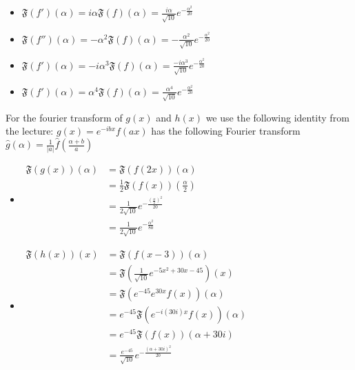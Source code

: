 \documentclass[11pt]{article}
\begin{document}
\begin{solution}
\begin{itemize}
\item $\mathfrak{F}\left(f' \right)(\alpha) = i \alpha \mathfrak{F}(f)(\alpha) = \frac{i \alpha}{\sqrt{10}} e^{-\frac{\alpha^2}{20}}$
\item $\mathfrak{F}\left(f'' \right)(\alpha) = -\alpha^2 \mathfrak{F}(f)(\alpha) = -\frac{ \alpha^2}{\sqrt{10}} e^{-\frac{\alpha^2}{20}}$
\item $\mathfrak{F}\left(f' \right)(\alpha) = -i \alpha^3 \mathfrak{F}(f)(\alpha) = \frac{-i \alpha^3}{\sqrt{10}} e^{-\frac{\alpha^2}{20}}$
\item $\mathfrak{F}\left(f' \right)(\alpha) = \alpha^4 \mathfrak{F}(f)(\alpha) = \frac{ \alpha^4}{\sqrt{10}} e^{-\frac{\alpha^2}{20}}$
\end{itemize}
For the fourier transform of $g(x)$ and $h(x)$ we use the following identity from the lecture: $g(x)=e^{-i b x} f(a x)$ has the following Fourier transform 
$\hat{g}(\alpha)=\frac{1}{|a|} \hat{f}\left(\frac{\alpha+b}{a}\right)$
\begin{itemize}
\item $\begin{aligned} \mathfrak{F}(g(x))(\alpha) & =\mathfrak{F}(f(2 x))(\alpha) \\ & =\frac{1}{2} \mathfrak{F}(f(x))\left(\frac{\alpha}{2}\right) \\ & =\frac{1}{2 \sqrt{10}} e^{-\frac{\left(\frac{\alpha}{2}\right)^2}{20}} \\ & =\frac{1}{2 \sqrt{10}} e^{-\frac{\alpha^2}{80}}\end{aligned}$
\item $\begin{aligned} \mathfrak{F}(h(x))(x) & =\mathfrak{F}(f(x-3))(\alpha) \\ & =\mathfrak{F}\left(\frac{1}{\sqrt{10}} e^{-5 x^2+30 x-45}\right)(x) \\ & =\mathfrak{F}\left(e^{-45} e^{30 x} f(x)\right)(\alpha) \\ & =e^{-45} \mathfrak{F}\left(e^{-i(30 i) x} f(x)\right)(\alpha) \\ & =e^{-45} \mathfrak{F}(f(x))(\alpha+30 i) \\ & =\frac{e^{-45}}{\sqrt{10}} e^{-\frac{(\alpha+30 i)^2}{20}}\end{aligned}$
\end{itemize}
\end{solution}
\end{document}
